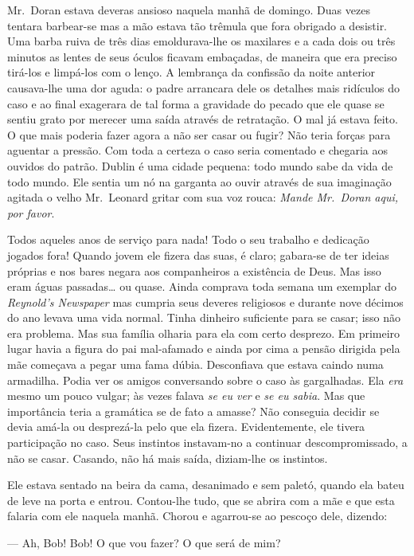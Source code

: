Mr.~Doran estava deveras ansioso naquela manhã de domingo.  Duas vezes tentara
barbear-se mas a mão estava tão trêmula que fora obrigado a desistir.  Uma
barba ruiva de três dias emoldurava-lhe os maxilares e a cada dois ou três
minutos as lentes de seus óculos ficavam embaçadas, de maneira que era preciso
tirá-los e limpá-los com o lenço.  A lembrança da confissão da noite anterior
causava-lhe uma dor aguda: o padre arrancara dele os detalhes mais ridículos do
caso e ao final exagerara de tal forma a gravidade do pecado que ele quase se
sentiu grato por merecer uma saída através de retratação.  O mal já estava
feito.  O que mais poderia fazer agora a não ser casar ou fugir?  Não teria
forças para aguentar a pressão.  Com toda a certeza o caso seria comentado e
chegaria aos ouvidos do patrão.  Dublin é uma cidade pequena: todo mundo sabe
da vida de todo mundo.  Ele sentia um nó na garganta ao ouvir através de sua
imaginação agitada o velho Mr.~Leonard gritar com sua voz rouca: \textit{Mande
Mr.~Doran aqui, por favor}.

Todos aqueles anos de serviço para nada!  Todo o seu trabalho e dedicação
jogados fora!  Quando jovem ele fizera das suas, é claro; gabara-se de ter
ideias próprias e nos bares negara aos companheiros a existência de Deus.  Mas
isso eram águas passadas\ldots{} ou quase.  Ainda comprava toda semana um
exemplar do \textit{Reynold’s Newspaper} mas cumpria seus deveres religiosos e
durante nove décimos do ano levava uma vida normal.  Tinha dinheiro suficiente
para se casar; isso não era problema.  Mas sua família olharia para ela com
certo desprezo.  Em primeiro lugar havia a figura do pai mal-afamado e ainda
por cima a pensão dirigida pela mãe começava a pegar uma fama dúbia.
Desconfiava que estava caindo numa armadilha.  Podia ver os amigos conversando
sobre o caso às gargalhadas.  Ela \textit{era} mesmo um pouco vulgar; às vezes
falava \textit{se eu ver} e \textit{se eu sabia}.  Mas que importância teria a
gramática se de fato a amasse?  Não conseguia decidir se devia amá-la ou
desprezá-la pelo que ela fizera.  Evidentemente, ele tivera participação no
caso.  Seus instintos instavam-no a continuar descompromissado, a não se casar.
Casando, não há mais saída, diziam-lhe os instintos.

Ele estava sentado na beira da cama, desanimado e sem paletó, quando ela bateu
de leve na porta e entrou.  Contou-lhe tudo, que se abrira com a mãe e que esta
falaria com ele naquela manhã.  Chorou e agarrou-se ao pescoço dele, dizendo:

--- Ah, Bob! Bob!  O que vou fazer?  O que será de mim?

